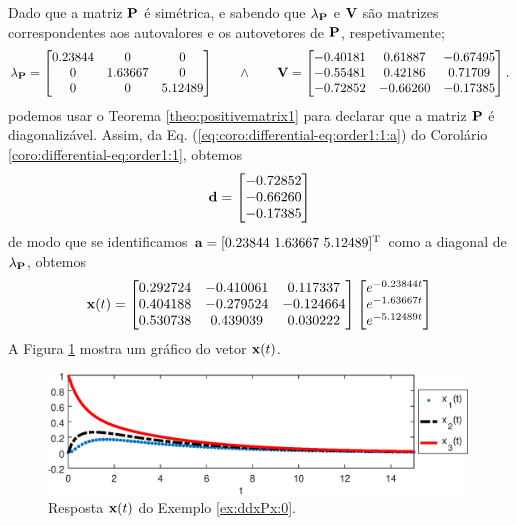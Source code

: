 \begin{SolutionT}
\label{ex:dxPx:0:sol1}
Dado que a matriz $\MATRIX{P}$ é simétrica, e
sabendo que $\lambda_{\MATRIX{P}}$ e $\MATRIX{V}$ são matrizes correspondentes aos autovalores e os autovetores de $\MATRIX{P}$,
respetivamente; 
\begin{equation}
\lambda_{\MATRIX{P}}=
\begin{bmatrix}
   0.23844 &       0 &       0\\
         0 & 1.63667 &       0\\
         0 &       0 & 5.12489
\end{bmatrix}
\qquad \wedge \qquad
\MATRIX{V}=
\begin{bmatrix}
  -0.40181 & 0.61887 &-0.67495\\
  -0.55481 & 0.42186 & 0.71709\\
  -0.72852 &-0.66260 &-0.17385
\end{bmatrix}.
\end{equation}
podemos usar o Teorema \ref{theo:positivematrix1} para declarar que a matriz $\MATRIX{P}$ é diagonalizável. 
Assim, da Eq. (\ref{eq:coro:differential-eq:order1:1:a}) do Corolário \ref{coro:differential-eq:order1:1},
obtemos
\begin{equation}
\VECTOR{d}=
\begin{bmatrix}
  -0.72852\\
  -0.66260\\
  -0.17385
\end{bmatrix}
\end{equation}
de modo que se identificamos $\VECTOR{a}=[0.23844~ 1.63667~ 5.12489]^{\transpose}$ como a diagonal de $\lambda_{\MATRIX{P}}$,
obtemos
\begin{equation}
 \VECTOR{x}(t)= 
\begin{bmatrix}
   0.292724 &-0.410061 & 0.117337\\
   0.404188 &-0.279524 &-0.124664\\
   0.530738 & 0.439039 & 0.030222
\end{bmatrix}
\begin{bmatrix}
   e^{-0.23844 t}\\
   e^{-1.63667 t}\\
   e^{-5.12489 t}
\end{bmatrix}
\end{equation}
A Figura \ref{fig:ex:dxPx:0} mostra um gráfico do vetor $\VECTOR{x}(t)$.
\end{SolutionT}
     \begin{figure}[!h]
         \centering
         \includegraphics[width=0.99\textwidth]{chapters/differential-eq/mfiles/primeiroorder/primeirooder1.eps}
         \caption{Resposta $\VECTOR{x}(t)$ do Exemplo \ref{ex:ddxPx:0}.}
         \label{fig:ex:dxPx:0}
     \end{figure}
